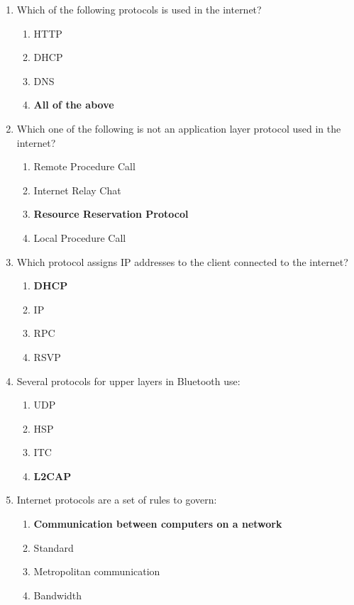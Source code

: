 \documentclass{article}
\begin{document}
\begin{enumerate}[label=\arabic*.]
    \item Which of the following protocols is used in the internet?
    \begin{enumerate}
        \item HTTP
        \item DHCP
        \item DNS
        \item \textbf{All of the above}
    \end{enumerate}

    \item Which one of the following is not an application layer protocol used in the internet?
    \begin{enumerate}
        \item Remote Procedure Call
        \item Internet Relay Chat
        \item \textbf{Resource Reservation Protocol}
        \item Local Procedure Call
    \end{enumerate}

    \item Which protocol assigns IP addresses to the client connected to the internet?
    \begin{enumerate}
        \item \textbf{DHCP}
        \item IP
        \item RPC
        \item RSVP
    \end{enumerate}

    \item Several protocols for upper layers in Bluetooth use:
    \begin{enumerate}
        \item UDP
        \item HSP
        \item ITC
        \item \textbf{L2CAP}
    \end{enumerate}

    \item Internet protocols are a set of rules to govern:
    \begin{enumerate}
        \item \textbf{Communication between computers on a network}
        \item Standard
        \item Metropolitan communication
        \item Bandwidth
    \end{enumerate}


\end{enumerate}
\end{document}

